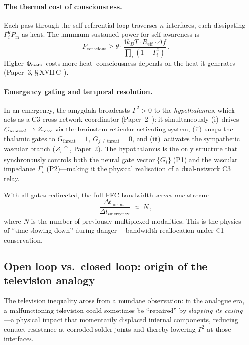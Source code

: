 \documentclass[aps,pre,twocolumn,superscriptaddress,floatfix]{revtex4-2}
\begin{document}
\paragraph{The thermal cost of consciousness.}
Each pass through the self-referential loop
traverses $n$ interfaces, each dissipating
$\Gamma_i^2 P_{\mathrm{in}}$ as heat.
The minimum sustained power for self-awareness is
\begin{equation}
  P_{\mathrm{conscious}} \geq
  \theta \cdot \frac{4 k_B T \cdot R_{\mathrm{eff}} \cdot \Delta f}
  {\prod_i (1 - \Gamma_i^2)}\,.
  \label{eq:P-conscious}
\end{equation}
Higher $\Phi_{\text{meta}}$ costs more heat;
consciousness depends on the heat it generates
(Paper~3, \S\,XVII\,C~\cite{Paper3}).

\paragraph{Emergency gating and temporal resolution.}
In an emergency, the amygdala broadcasts
$\Gamma^2 > 0$ to the \emph{hypothalamus}, which
acts as a C3 cross-network coordinator
(Paper~2~\cite{Paper2}): it simultaneously
(i)~drives $G_{\text{arousal}} \to Z_{\max}$ via the
brainstem reticular activating system,
(ii)~snaps the thalamic gates to
$G_{\text{threat}} = 1,\; G_{j \neq \text{threat}} = 0$,
and
(iii)~activates the sympathetic vascular branch
($Z_v \uparrow$, Paper~2).
The hypothalamus is the only structure that
synchronously controls both the neural gate vector
$\{G_i\}$ (P1) and the vascular impedance
$\Gamma_v$ (P2)---making it the physical
realisation of a dual-network C3 relay.

With all gates redirected, the full PFC bandwidth
serves one stream:
\begin{equation}
  \frac{\Delta t_{\text{normal}}}
       {\Delta t_{\text{emergency}}}
  \;\approx\; N\,,
  \label{eq:time-dilation}
\end{equation}
where $N$ is the number of previously multiplexed modalities.
This is the physics of ``time slowing down'' during danger---
bandwidth reallocation under C1 conservation.

\subsection{Open loop vs.\ closed loop: origin of the
  television analogy}

The television inequality arose from a mundane
observation: in the analogue era, a malfunctioning
television could sometimes be ``repaired'' by
\emph{slapping its casing}---a physical impact that
momentarily displaced internal components, reducing
contact resistance at corroded solder joints
and thereby lowering $\Gamma^2$ at those interfaces.
\end{document}
